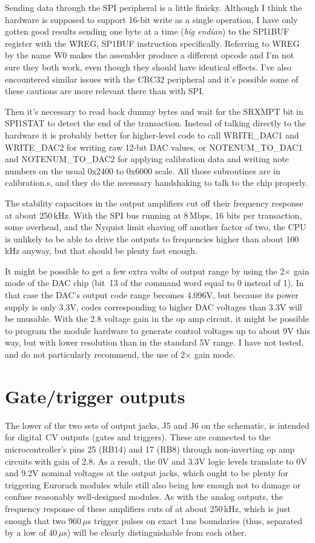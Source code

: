 Sending data through the SPI peripheral is a little finicky.  Although I
think the hardware is supposed to support 16-bit write as a single
operation, I have only gotten good results sending one byte at a time
(\emph{big endian}) to the SPI1BUF register with the  WREG,
SP1BUF instruction specifically.  Referring to WREG by the name W0 makes the
assembler produce a different opcode and I'm not sure they both work, even
though they should have identical effects.  I've also encountered similar
issues with the CRC32 peripheral and it's possible some of these cautions
are more relevant there than with SPI.

Then it's necessary to read back dummy bytes and wait for the SRXMPT bit in
SPI1STAT to detect the end of the transaction.  Instead of talking directly
to the hardware it is probably better for higher-level code to call
WRITE\_DAC1 and WRITE\_DAC2 for writing raw 12-bit DAC values, or
NOTENUM\_TO\_DAC1 and NOTENUM\_TO\_DAC2 for applying calibration data and
writing note numbers on the usual 0x2400 to 0x6000 scale.  All those
subroutines are in calibration.s, and they do the necessary handshaking to
talk to the chip properly.

The stability capacitors in the output amplifiers cut off their frequency
response at about 250\,kHz.  With the SPI bus running at 8\,Mbps, 16 bits per
transaction, some overhead, and the Nyquist limit shaving off another factor
of two, the CPU is unlikely to be able to drive the outputs to frequencies
higher than about 100\,kHz anyway, but that should be plenty fast enough.

It might be possible to get a few extra volts of output range by using the
2$\times$ gain mode of the DAC chip (bit~13 of the command word equal to 0
instead of 1).  In that case the DAC's output code range becomes 4.096V, but
because its power supply is only 3.3V, codes corresponding to higher DAC
voltages than 3.3V will be unusable.  With the 2.8 voltage gain in the op
amp circuit, it might be possible to program the module hardware to generate
control voltages up to about 9V this way, but with lower resolution than in
the standard 5V range.  I have not tested, and do not particularly
recommend, the use of 2$\times$ gain mode.

\section{Gate/trigger outputs}

The lower of the two sets of output jacks, J5 and J6 on the schematic, is
intended for digital~CV outputs (gates and triggers).  These are connected
to the microcontroller's pins 25 (RB14) and 17 (RB8) through non-inverting
op amp circuits with gain of 2.8.  As a result, the 0V and 3.3V logic levels
translate to 0V and 9.2V nominal voltages at the output jacks, which ought
to be plenty for triggering Eurorack modules while still also being low
enough not to damage or confuse reasonably well-designed modules.  As with
the analog outputs, the frequency response of these amplifiers cuts of at
about 250\,kHz, which is just enough that two 960\,$\mu$s trigger pulses
on exact 1\,ms boundaries (thus, separated by a low of 40\,$\mu$s) will be
clearly distinguishable from each other.

